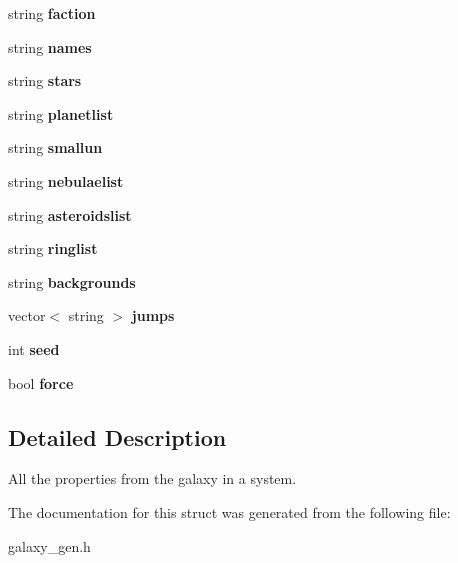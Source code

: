 \begin{DoxyCompactItemize}
\item 
string {\bfseries faction}\hypertarget{structSystemInfo_afa44d775451850c08fa62dc75ecb0c6b}{}\label{structSystemInfo_afa44d775451850c08fa62dc75ecb0c6b}

\item 
string {\bfseries names}\hypertarget{structSystemInfo_a8f13e5924a1d7bb019b44114f7f2eb74}{}\label{structSystemInfo_a8f13e5924a1d7bb019b44114f7f2eb74}

\item 
string {\bfseries stars}\hypertarget{structSystemInfo_a6831c68e5999687d08a69e6654a5258b}{}\label{structSystemInfo_a6831c68e5999687d08a69e6654a5258b}

\item 
string {\bfseries planetlist}\hypertarget{structSystemInfo_afba488756073bffb5e126955534c135e}{}\label{structSystemInfo_afba488756073bffb5e126955534c135e}

\item 
string {\bfseries smallun}\hypertarget{structSystemInfo_a62ffa1f2313bf7b4900f1880b31d91be}{}\label{structSystemInfo_a62ffa1f2313bf7b4900f1880b31d91be}

\item 
string {\bfseries nebulaelist}\hypertarget{structSystemInfo_aea2d6a1babb381ec284765486c6efdda}{}\label{structSystemInfo_aea2d6a1babb381ec284765486c6efdda}

\item 
string {\bfseries asteroidslist}\hypertarget{structSystemInfo_a57d01257809c76c4595e7e8899f9d135}{}\label{structSystemInfo_a57d01257809c76c4595e7e8899f9d135}

\item 
string {\bfseries ringlist}\hypertarget{structSystemInfo_a1d6e9f49a3f4ce7acb94d3a21729ed61}{}\label{structSystemInfo_a1d6e9f49a3f4ce7acb94d3a21729ed61}

\item 
string {\bfseries backgrounds}\hypertarget{structSystemInfo_a32c59946efeb5a2c04292ecd1fbe2f95}{}\label{structSystemInfo_a32c59946efeb5a2c04292ecd1fbe2f95}

\item 
vector$<$ string $>$ {\bfseries jumps}\hypertarget{structSystemInfo_ad57eba4d8b42f04c0b4df4e0e0db9800}{}\label{structSystemInfo_ad57eba4d8b42f04c0b4df4e0e0db9800}

\item 
int {\bfseries seed}\hypertarget{structSystemInfo_a6c148481a5271d10cd6e33b6eb8e3e9d}{}\label{structSystemInfo_a6c148481a5271d10cd6e33b6eb8e3e9d}

\item 
bool {\bfseries force}\hypertarget{structSystemInfo_a21bc18f647ea92de564d4b08345fd316}{}\label{structSystemInfo_a21bc18f647ea92de564d4b08345fd316}

\end{DoxyCompactItemize}


\subsection{Detailed Description}
All the properties from the galaxy in a system. 

The documentation for this struct was generated from the following file\+:\begin{DoxyCompactItemize}
\item 
galaxy\+\_\+gen.\+h\end{DoxyCompactItemize}
